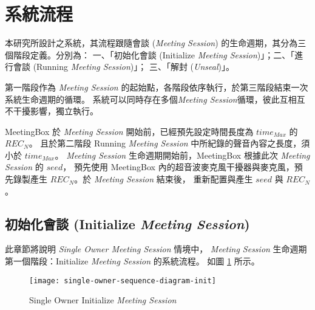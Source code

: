 \section{系統流程}

    本研究所設計之系統，其流程跟隨會談 ({\it Meeting Session}) 的生命週期，其分為三個階段定義。分別為：
一、「初始化會談 (Initialize {\it Meeting Session})」；二、「進行會談 (Running {\it Meeting Session})」；
三、「解封 ({\it Unseal})」。

    第一階段作為 {\it Meeting Session} 的起始點，各階段依序執行，於第三階段結束一次系統生命週期的循環。
系統可以同時存在多個{\it Meeting Session}循環，彼此互相互不干擾影響，獨立執行。

    MeetingBox 於 {\it Meeting Session} 開始前，已經預先設定時間長度為 $time_{Max}$ 的 $REC_{N}$。
且於第二階段 Running {\it Meeting Session} 中所紀錄的聲音內容之長度，須小於  $time_{Max}$。
{\it Meeting Session} 生命週期開始前，MeetingBox 根據此次 {\it Meeting Session} 的 $seed$，
預先使用 MeetingBox 內的超音波麥克風干擾器與麥克風，預先錄製產生 $REC_{N}$。於 {\it Meeting Session} 結束後，
重新配置與產生 $seed$ 與 $REC_{N}$。


\subsection{初始化會談 (Initialize {\it Meeting Session})}

    此章節將說明 {\it Single Owner Meeting Session} 情境中，
{\it Meeting Session} 生命週期第一個階段：Initialize {\it Meeting Session} 的系統流程。
如圖 \ref{fig.s-o-init} 所示。

\begin{figure}[H]
    \centering
    \texttt{[image: single-owner-sequence-diagram-init]}
    \caption{Single Owner Initialize {\it Meeting Session}}
    \label{fig.s-o-init}
\end{figure}

